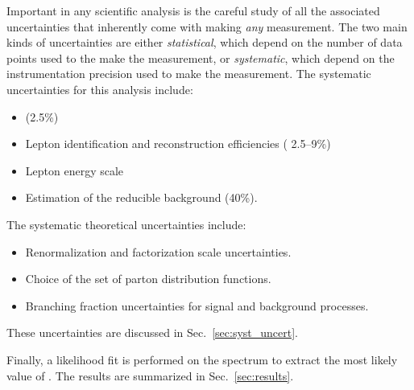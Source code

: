 
Important in any scientific analysis is the careful study of all the associated uncertainties that inherently come with making \emph{any} measurement.
The two main kinds of uncertainties are either \emph{statistical}, which depend on the number of data points used to the make the measurement, or \emph{systematic}, which depend on the instrumentation precision used to make the measurement.
The systematic uncertainties for this analysis include:
\begin{itemize}
	\item \lumiint
	(2.5\%)
	\item Lepton identification and reconstruction efficiencies (
		2.5--9\%)
	\item Lepton energy scale
	\item Estimation of the reducible background (40\%).
\end{itemize}
The systematic theoretical uncertainties include:
\begin{itemize}
	\item Renormalization and factorization scale uncertainties.
	\item Choice of the set of parton distribution functions.
	\item Branching fraction uncertainties for signal and background processes.
\end{itemize}
These uncertainties are discussed in Sec.~\ref{sec:syst_uncert}.

Finally, a likelihood fit is performed on the \mH spectrum to extract the most likely value of \mH.
The results are summarized in Sec.~\ref{sec:results}.

